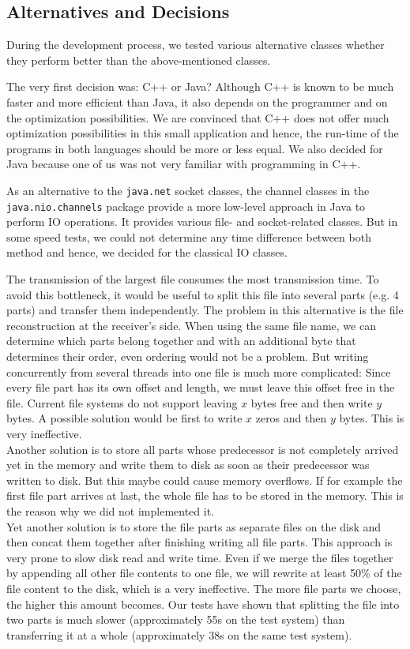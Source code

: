 \documentclass[12pt,a4paper]{article}
\begin{document}
\subsection{Alternatives and Decisions}
During the development process, we tested various alternative classes whether they perform better than the above-mentioned classes.

The very first decision was: C++ or Java? Although C++ is known to be much faster and more efficient than Java, it also depends on the programmer and on the optimization possibilities. We are convinced that C++ does not offer much optimization possibilities in this small application and hence, the run-time of the programs in both languages should be more or less equal. We also decided for Java because one of us was not very familiar with programming in C++.

As an alternative to the \lstinline!java.net! socket classes, the channel classes in the \lstinline!java.nio.channels! package provide a more low-level approach in Java to perform IO operations. It provides various file- and socket-related classes. But in some speed tests, we could not determine any time difference between both method and hence, we decided for the classical IO classes.

The transmission of the largest file consumes the most transmission time. To avoid this bottleneck, it would be useful to split this file into several parts (e.g. 4 parts) and transfer them independently. The problem in this alternative is the file reconstruction at the receiver's side. When using the same file name, we can determine which parts belong together and with an additional byte that determines their order, even ordering would not be a problem. But writing concurrently from several threads into one file is much more complicated: Since every file part has its own offset and length, we must leave this offset free in the file. Current file systems do not support leaving $x$ bytes free and then write $y$ bytes. A possible solution would be first to write $x$ zeros and then $y$ bytes. This is very ineffective. \\ Another solution is to store all parts whose predecessor is not completely arrived yet in the memory and write them to disk as soon as their predecessor was written to disk. But this maybe could cause memory overflows. If for example the first file part arrives at last, the whole file has to be stored in the memory. This is the reason why we did not implemented it. \\ Yet another solution is to store the file parts as separate files on the disk and then concat them together after finishing writing all file parts. This approach is very prone to slow disk read and write time. Even if we merge the files together by appending all other file contents to one file, we will rewrite at least 50\% of the file content to the disk, which is a very ineffective. The more file parts we choose, the higher this amount becomes. Our tests have shown that splitting the file into two parts is much slower (approximately 55s on the test system) than transferring it at a whole (approximately 38s on the same test system). 
\end{document}
